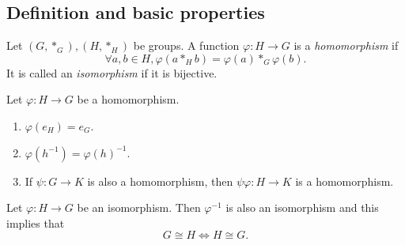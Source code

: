 \documentclass[10pt]{article}
\begin{document}
    \subsection{Definition and basic properties}
    \begin{definition}
        Let $ (G,*_G), (H,*_H) $ be groups. A function $ \varphi: H \to G $ is a \textit{homomorphism} if
        \[
            \forall a,b\in H, \varphi (a*_Hb)=\varphi (a)*_G \varphi (b)
        .\]
        It is called an \textit{isomorphism} if it is bijective.
    \end{definition}
    \begin{proposition}\label{prop:homom}
        Let $ \varphi :H\to G $ be a homomorphism.
        \begin{enumerate}[(1)]
            \item $ \varphi (e_H)=e_G $.
            \item $ \varphi (h^{-1})=\varphi (h)^{-1} $.
            \item If $ \psi:G\to K $ is also a homomorphism, then $ \psi \varphi :H\to K $ is a homomorphism.
        \end{enumerate}
    \end{proposition}
    \begin{proposition}\label{prop:isom_inverse_is_also_an_isom}
        Let $ \varphi :H\to G $ be an isomorphism. Then $ \varphi^{-1} $ is also an isomorphism and this implies that 
        \[
            G \cong H \Longleftrightarrow H \cong G
        .\]
    \end{proposition}
\end{document}

